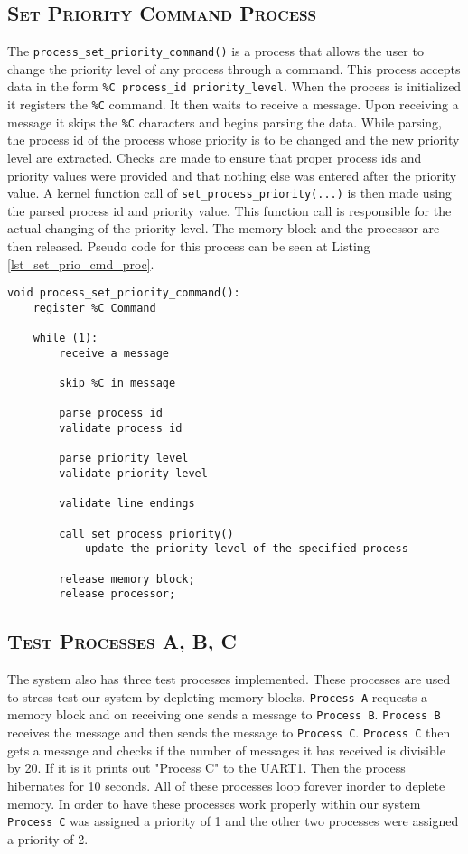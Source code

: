 \documentclass[oneside]{report}
\begin{document}
\subsection{\textsc{Set Priority Command Process}}
The \texttt{process\_set\_priority\_command()} is a process that
allows the user to change the priority level of any process through a
command. This process accepts data in the form \texttt{\%C process\_id 
priority\_level}. When the process is initialized it registers the
\texttt{\%C} command. It then waits to receive a message.  Upon receiving a
message it skips the \texttt{\%C} characters and begins parsing the
data. While parsing, the process id of the process whose priority is
to be changed and the new priority level are extracted. Checks are
made to ensure that proper process ids and priority values were
provided and that nothing else was entered after the priority value. A
kernel function call of \texttt{set\_process\_priority(...)} is then
made using the parsed process id and priority value. This function
call is responsible for the actual changing of the priority level. The
memory block and the processor are then released.  Pseudo code for
this process can be seen at Listing \ref{lst_set_prio_cmd_proc}.


\begin{lstlisting}
void process_set_priority_command():    
    register %C Command

    while (1):
        receive a message

        skip %C in message

        parse process id
        validate process id

        parse priority level
        validate priority level

        validate line endings
        
        call set_process_priority()
            update the priority level of the specified process

        release memory block;
        release processor;
\end{lstlisting}

\subsection{\textsc{Test Processes A, B, C}}
The system also has three test processes implemented. These processes are used
to stress test our system by depleting memory blocks. \texttt{Process A}
requests a memory block and on receiving one sends a message to \texttt{Process
B}. \texttt{Process B} receives the message and then sends the message to
\texttt{Process C}. \texttt{Process C} then gets a message and checks if the
number of messages it has received is divisible by 20. If it is it prints out
"Process C" to the UART1. Then the process hibernates for 10 seconds. All of
these processes loop forever inorder to deplete memory. In order to have these
processes work properly within our system \texttt{Process C} was assigned a
priority of 1 and the other two processes were assigned a priority of 2.
\end{document}
